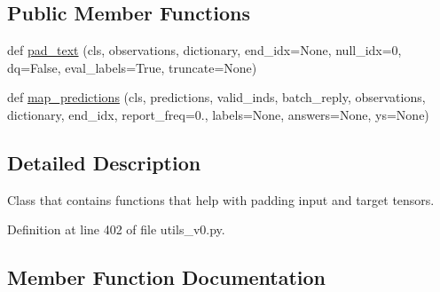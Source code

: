 \subsection*{Public Member Functions}
\begin{DoxyCompactItemize}
\item 
def \hyperlink{classparlai_1_1agents_1_1legacy__agents_1_1seq2seq_1_1utils__v0_1_1PaddingUtils_ae7f9ca3d9fd7dd823895a28af6cae34f}{pad\+\_\+text} (cls, observations, dictionary, end\+\_\+idx=None, null\+\_\+idx=0, dq=False, eval\+\_\+labels=True, truncate=None)
\item 
def \hyperlink{classparlai_1_1agents_1_1legacy__agents_1_1seq2seq_1_1utils__v0_1_1PaddingUtils_ae2c46f2f424e4301873e1c5bc201646c}{map\+\_\+predictions} (cls, predictions, valid\+\_\+inds, batch\+\_\+reply, observations, dictionary, end\+\_\+idx, report\+\_\+freq=0., labels=None, answers=None, ys=None)
\end{DoxyCompactItemize}


\subsection{Detailed Description}
\begin{DoxyVerb}Class that contains functions that help with padding input and target tensors.
\end{DoxyVerb}
 

Definition at line 402 of file utils\+\_\+v0.\+py.



\subsection{Member Function Documentation}
\mbox{\label{classparlai_1_1agents_1_1legacy__agents_1_1seq2seq_1_1utils__v0_1_1PaddingUtils_ae2c46f2f424e4301873e1c5bc201646c}} 
